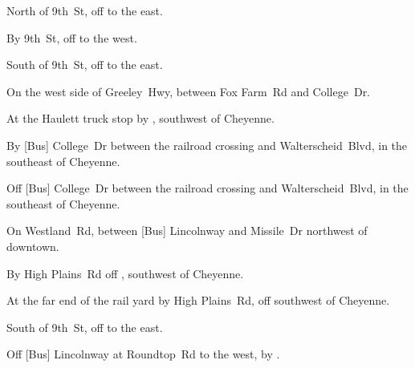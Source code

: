 
\begin{LocationList}

North of 9th~St, off   to the east.

By 9th~St, off   to the west.

South of 9th~St, off   to the east.

On the west side of  Greeley~Hwy, between Fox Farm~Rd and College~Dr.

At the Haulett truck stop by  , southwest of Cheyenne.

By [Bus]  College~Dr between the railroad crossing and Walterscheid~Blvd, in the southeast of Cheyenne.

Off [Bus]  College~Dr between the railroad crossing and Walterscheid~Blvd, in the southeast of Cheyenne.

On Westland~Rd, between [Bus] Lincolnway and Missile~Dr northwest of downtown.

By High Plains~Rd off  , southwest of Cheyenne.

At the far end of the rail yard by High Plains~Rd, off   southwest of Cheyenne.

South of 9th~St, off   to the east.

Off [Bus] Lincolnway at  Roundtop~Rd to the west, by  .

\end{LocationList}
